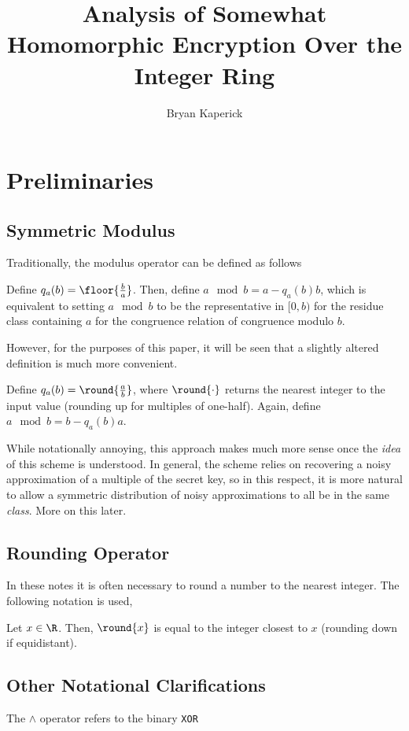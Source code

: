 \documentclass[a4paper,11pt, oneside]{article}
\title{Analysis of Somewhat Homomorphic Encryption Over the Integer Ring}
\author{Bryan Kaperick}
\begin{document}
\maketitle\newpage
\section{Preliminaries}
\subsection{Symmetric Modulus}
Traditionally, the modulus operator can be defined as follows
\begin{definition}
  Define $q_a(b) = \floor{\frac{b}{a}}$.  Then, define $a\mod{b} = a - q_a(b)b$, which is equivalent to setting $a\mod{b}$ to be the representative in $[0,b)$ for the residue class containing $a$ for the congruence relation of congruence modulo $b$.
\end{definition}

However, for the purposes of this paper, it will be seen that a slightly altered definition is much more convenient.
\begin{definition}
  Define $q_a(b) = \round{\frac{a}{b}}$, where $\round{\cdot}$ returns the nearest integer to the input value (rounding up for multiples of one-half).  Again, define $a\mod{b} = b - q_a(b)a$.  
\end{definition}

While notationally annoying, this approach makes much more sense once the \emph{idea} of this scheme is understood.  In general, the scheme relies on recovering a noisy approximation of a multiple of the secret key, so in this respect, it is more natural to allow a symmetric distribution of noisy approximations to all be in the same \emph{class}.  More on this later.

\subsection{Rounding Operator}

In these notes it is often necessary to round a number to the nearest integer.  The following notation is used,
\begin{definition}
  Let $x\in\R$.  Then, $\round{x}$ is equal to the integer closest to $x$ (rounding down if equidistant).
\end{definition}


\subsection{Other Notational Clarifications}
The $\wedge$ operator refers to the binary \texttt{XOR}
\end{document}

